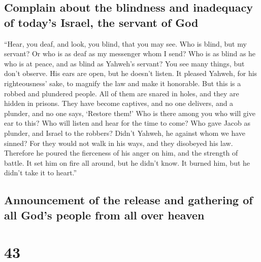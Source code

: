 \hypertarget{complain-about-the-blindness-and-inadequacy-of-todays-israel-the-servant-of-god}{%
\subsection{Complain about the blindness and inadequacy of today's
Israel, the servant of
God}\label{complain-about-the-blindness-and-inadequacy-of-todays-israel-the-servant-of-god}}

 ``Hear, you deaf, and look, you blind, that you may see.
 Who is blind, but my servant? Or who is as deaf as my
messenger whom I send? Who is as blind as he who is at peace, and as
blind as Yahweh's servant?  You see many things, but
don't observe. His ears are open, but he doesn't listen. 
It pleased Yahweh, for his righteousness' sake, to magnify the law and
make it honorable.  But this is a robbed and plundered
people. All of them are snared in holes, and they are hidden in prisons.
They have become captives, and no one delivers, and a plunder, and no
one says, `Restore them!'  Who is there among you who
will give ear to this? Who will listen and hear for the time to come?
 Who gave Jacob as plunder, and Israel to the robbers?
Didn't Yahweh, he against whom we have sinned? For they would not walk
in his ways, and they disobeyed his law.  Therefore he
poured the fierceness of his anger on him, and the strength of battle.
It set him on fire all around, but he didn't know. It burned him, but he
didn't take it to heart.''

\hypertarget{announcement-of-the-release-and-gathering-of-all-gods-people-from-all-over-heaven}{%
\subsection{Announcement of the release and gathering of all God's
people from all over
heaven}\label{announcement-of-the-release-and-gathering-of-all-gods-people-from-all-over-heaven}}

\hypertarget{section-42}{%
\section{43}\label{section-42}}

